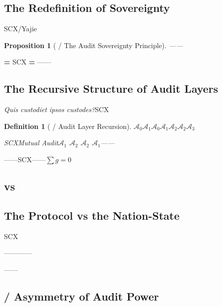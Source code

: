 \documentclass[12pt,a4paper]{article}
\newtheorem{proposition}[theorem]{Proposition}
\newtheorem{definition}[theorem]{Definition}
\theoremstyle{remark}
\begin{document}
\subsection{}
\subsection{The Redefinition of Sovereignty}

\textbf{}

SCX/Yajie

\begin{proposition}[ / The Audit Sovereignty Principle]
    \textbf{}——
\end{proposition}

\textbf{ = }SCX\textbf{ = }——

\subsection{}
\subsection{The Recursive Structure of Audit Layers}

\textit{Quis custodiet ipsos custodes?}SCX

\begin{definition}[ / Audit Layer Recursion]
    $\mathcal{A}_0$$\mathcal{A}_1$$\mathcal{A}_0$$\mathcal{A}_1$$\mathcal{A}_2$$\mathcal{A}_2$$\mathcal{A}_3$

    SCX\textbf{}Mutual Audit$\mathcal{A}_1$  $\mathcal{A}_2$  $\mathcal{A}_2$  $\mathcal{A}_1$——\textbf{}
\end{definition}

——SCX——\textbf{}$\sum g = 0$

\subsection{ vs }
\subsection{The Protocol vs the Nation-State}

SCX

\begin{keybox}[title=\textbf{ / Protocol Sovereignty}]
    \textbf{}——\textbf{}——\textbf{}
\end{keybox}

\textbf{}——

\subsection{ / Asymmetry of Audit Power}
\end{document}
